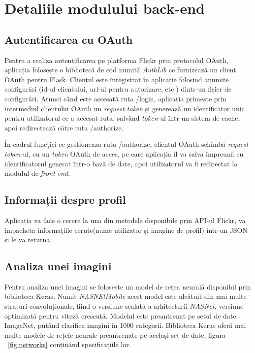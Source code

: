 \section{Detaliile modulului back-end}
\subsection{Autentificarea cu OAuth}
Pentru a realiza autentificarea pe platforma Flickr prin protocolul OAuth, aplicația folosește o bibliotecă de cod numită \textit{AuthLib} ce furnizează un client OAuth pentru Flask. Clientul este înregistrat în aplicație folosind anumite configurări (id-ul clientului, url-ul pentru autorizare, etc.) dintr-un fișier de configurări. Atunci când este accesată ruta /login, aplicația primește prin intermediul clientului OAuth un \textit{request token} și generează un identificator unic pentru utilizatorul ce a accesat ruta, salvând \textit{token}-ul într-un sistem de cache, apoi redirectează către ruta /authorize.

În cadrul funcției ce gestioneaza ruta /authorize, clientul OAuth schimbă \textit{request token}-ul, cu un \textit{token} OAuth de acces, pe care aplicația îl va salva împreună cu identificatorul generat într-o bază de date, apoi utilizatorul va fi redirectat la modulul de \textit{front-end}.

\subsection{Informații despre profil}
Aplicația va face o cerere la una din metodele disponibile prin API-ul Flickr, va împacheta informațiile cerute(nume utilizator și imagine de profil) într-un JSON și le va returna.

\subsection{Analiza unei imagini}
Pentru analiza unei imagini se folosește un model de rețea neurală disponibil prin biblioteca Keras. Numit \textit{NASNEtMobile} acest model este alcătuit din mai multe straturi convoluționale, fiind o versiune scalată a arhitecturii \textit{NASNet}, versiune optimizată pentru viteză crescută. Modelul este preantrenat pe setul de date ImageNet, putând clasifica imagini în 1000 categorii.
Biblioteca Keras oferă mai multe modele de rețele neurale preantrenate pe același set de date, figura ~\ref{fig:networks} conținând specificațiile lor.

